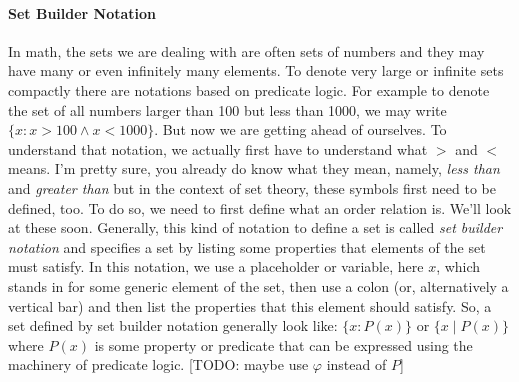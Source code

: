 \paragraph{Set Builder Notation}
In math, the sets we are dealing with are often sets of numbers and they may have many or even infinitely many elements. To denote very large or infinite sets compactly there are notations based on predicate logic. For example to denote the set of all numbers larger than 100 but less than 1000, we may write $\{x : x > 100 \wedge x < 1000\}$. But now we are getting ahead of ourselves. To understand that notation, we actually first have to understand what $>$ and $<$ means. I'm pretty sure, you already do know what they mean, namely, \emph{less than} and \emph{greater than} but in the context of set theory, these symbols first need to be defined, too. To do so, we need to first define what an order relation is. We'll look at these soon. Generally, this kind of notation to define a set is called \emph{set builder notation} and specifies a set by listing some properties that elements of the set must satisfy. In this notation, we use a placeholder or variable, here $x$, which stands in for some generic element of the set, then use a colon (or, alternatively a vertical bar) and then list the properties that this element should satisfy. So, a set defined by set builder notation generally look like: $\{x : P(x)\}$ or  $\{x \; | \; P(x)\}$ where $P(x)$ is some property or predicate that can be expressed using the machinery of predicate logic. [TODO: maybe use $\varphi$ instead of $P$]




